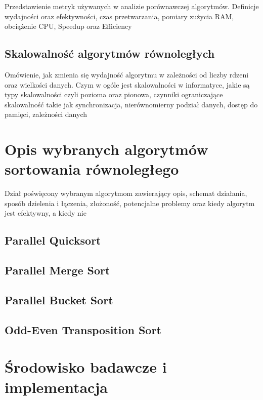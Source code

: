 \documentclass{PracaDyplomowa-Szablon}
\begin{document}
Przedstawienie metryk używanych w analizie porównawczej algorytmów. Definicje wydajności oraz efektywności, czas przetwarzania, pomiary zużycia RAM, obciążenie CPU, Speedup oraz Efficiency

\section{Skalowalność algorytmów równoległych}
\label{sec:SkalowalnoscAlgorytmow}

Omówienie, jak zmienia się wydajność algorytmu w zależności od liczby rdzeni oraz wielkości danych. Czym w ogóle jest skalowalności w informatyce, jakie są typy skalowalności czyli pozioma oraz pionowa, czynniki ograniczające skalowalność takie jak synchronizacja, nierównomierny podział danych, dostęp do pamięci, zależności danych

\chapter{Opis wybranych algorytmów sortowania równoległego}
\label{cha:WybraneAlgorytmy}

Dział poświęcony wybranym algorytmom zawierający opis, schemat działania, sposób dzielenia i łączenia, złożoność, potencjalne problemy oraz kiedy algorytm jest efektywny, a kiedy nie

\section{Parallel Quicksort}
\label{sec:ParallelQuicksort}


\section{Parallel Merge Sort}
\label{sec:ParallelMergeSort}



\section{Parallel Bucket Sort}
\label{sec:ParallelBucketSort}



\section{Odd-Even Transposition Sort}
\label{sec:Odd-EvenTranspositionSort}




\chapter{Środowisko badawcze i implementacja}
\label{cha:SrodowiskoImplementacja}
\end{document}
